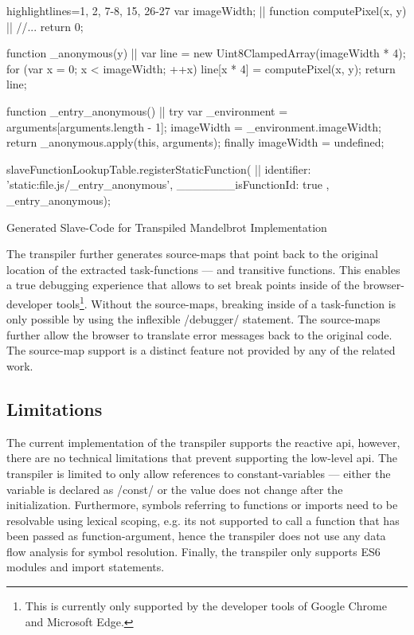 \begin{listing}
\begin{javascriptcode*}{highlightlines={1, 2, 7-8, 15, 26-27}}
var imageWidth; |$\label{code:slave-image-width}$|
function computePixel(x, y) { |$\label{code:slave-compute-pixel}$|
	//...
	return 0;
}

function _anonymous(y) { |$\label{code:slave-task-function}$|
	var line = new Uint8ClampedArray(imageWidth * 4);
	for (var x = 0; x < imageWidth; ++x) {
		line[x * 4] = computePixel(x, y);
	}
	return line;
}

function _entry_anonymous() { |$\label{code:slave-entry-function}$|
	try {
		var _environment = arguments[arguments.length - 1];
		imageWidth = _environment.imageWidth;
		return _anonymous.apply(this, arguments);
	} finally {
		imageWidth = undefined;
	}
}

slaveFunctionLookupTable.registerStaticFunction({ |$\label{code:slave-register-function}$|
	identifier: 'static:file.js/_entry_anonymous',
	_______isFunctionId: true
}, _entry_anonymous);
\end{javascriptcode*}
\caption{Generated Slave-Code for Transpiled Mandelbrot Implementation}
\label{fig:transpiled-mandelbrot-slave}
\end{listing}

The transpiler further generates source-maps that point back to the original location of the extracted task-functions --- and transitive functions. This enables a true debugging experience that allows to set break points inside of the browser-developer tools\footnote{This is currently only supported by the developer tools of Google Chrome and Microsoft Edge.}. Without the source-maps, breaking inside of a task-function is only possible by using the inflexible \javascriptinline/debugger/ statement. The source-maps further allow the browser to translate error messages back to the original code. The source-map support is a distinct feature not provided by any of the related work.

\subsection{Limitations}
The current implementation of the transpiler supports the reactive api, however, there are no technical limitations that prevent supporting the low-level api. The transpiler is limited to only allow references to constant-variables --- either the variable is declared as \javascriptinline/const/ or the value does not change after the initialization. Furthermore, symbols referring to functions or imports need to be resolvable using lexical scoping, e.g. its not supported to call a function that has been passed as function-argument, hence the transpiler does not use any data flow analysis for symbol resolution. Finally, the transpiler only supports ES6 modules and import statements.
